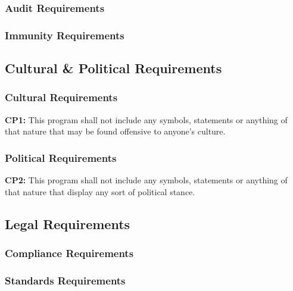 \documentclass[titlepage]{article}
\begin{document}
\subsubsection{Audit Requirements}
\subsubsection{Immunity Requirements}

\subsection{Cultural \& Political Requirements}
\subsubsection{Cultural Requirements}
\textbf{CP1:} This program shall not include any symbols, statements or anything of that nature that may be found offensive to anyone's culture.
\subsubsection{Political Requirements}
\textbf{CP2:} This program shall not include any symbols, statements or anything of that nature that display any sort of political stance.

\subsection{Legal Requirements}
\subsubsection{Compliance Requirements}
\subsubsection{Standards Requirements}
\end{document}
